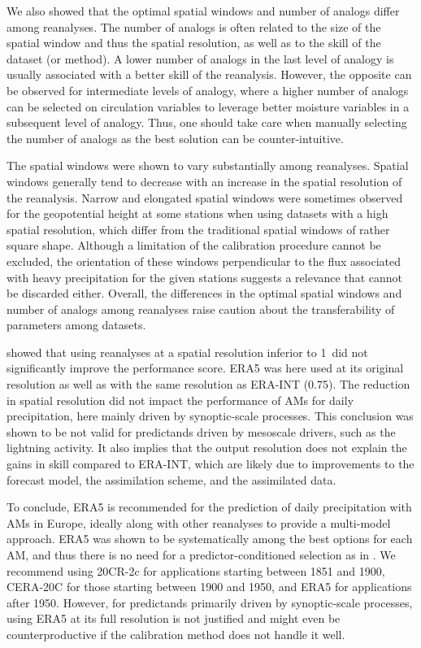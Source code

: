 \documentclass[alpha-refs]{wiley-article}
\begin{document}
We also showed that the optimal spatial windows and number of analogs differ among reanalyses. The number of analogs is often related to the size of the spatial window and thus the spatial resolution, as well as to the skill of the dataset (or method). A lower number of analogs in the last level of analogy is usually associated with a better skill of the reanalysis. However, the opposite can be observed for intermediate levels of analogy, where a higher number of analogs can be selected on circulation variables to leverage better moisture variables in a subsequent level of analogy. Thus, one should take care when manually selecting the number of analogs as the best solution can be counter-intuitive.

The spatial windows were shown to vary substantially among reanalyses. Spatial windows generally tend to decrease with an increase in the spatial resolution of the reanalysis. Narrow and elongated spatial windows were sometimes observed for the geopotential height at some stations when using datasets with a high spatial resolution, which differ from the traditional spatial windows of rather square shape. Although a limitation of the calibration procedure cannot be excluded, the orientation of these windows perpendicular to the flux associated with heavy precipitation for the given stations suggests a relevance that cannot be discarded either. Overall, the differences in the optimal spatial windows and number of analogs among reanalyses raise caution about the transferability of parameters among datasets.

\citet{Horton2018b} showed that using reanalyses at a spatial resolution inferior to  1\degree\ did not significantly improve the performance score. ERA5 was here used at its original resolution as well as with the same resolution as ERA-INT (0.75\degree). The reduction in spatial resolution did not impact the performance of AMs for daily precipitation, here mainly driven by synoptic-scale processes. This conclusion was shown to be not valid for predictands driven by mesoscale drivers, such as the lightning activity. It also implies that the output resolution does not explain the gains in skill compared to ERA-INT, which are likely due to improvements to the forecast model, the assimilation scheme, and the assimilated data.

To conclude, ERA5 is recommended for the prediction of daily precipitation with AMs in Europe, ideally along with other reanalyses to provide a multi-model approach. ERA5 was shown to be systematically among the best options for each AM, and thus there is no need for a predictor-conditioned selection as in \citet{Horton2018b}. We recommend using 20CR-2c for applications starting between 1851 and 1900, CERA-20C for those starting between 1900 and 1950, and ERA5 for applications after 1950. However, for predictands primarily driven by synoptic-scale processes, using ERA5 at its full resolution is not justified and might even be counterproductive if the calibration method does not handle it well.
\end{document}
